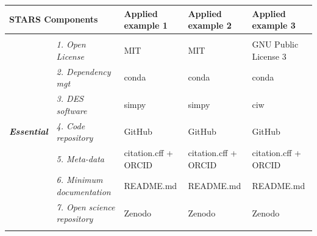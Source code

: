\documentclass[]{interact}
\theoremstyle{plain}%
\theoremstyle{definition}
\theoremstyle{remark}
\begin{document}
\begin{table}[htp!]
{\begin{tabular}{lllll} \toprule
\multicolumn{2}{l}{\textbf{STARS Components}}                                    & \textbf{Applied example 1} & \textbf{Applied example 2} & \textbf{Applied example 3} \\ 
\hline \\
\multirow{7}{*}{\textit{\textbf{Essential}}}     & \textit{1. Open License}              & MIT                                                          & MIT                                                          & GNU Public License 3                                         \\
                                            & \textit{2. Dependency mgt}            & conda                                                       & conda                                                        & conda                                                        \\
                                            & \textit{3. DES software}              & simpy                                                        & simpy                                                        & ciw                                                          \\
                                            & \textit{4. Code repository}           & GitHub                                                       & GitHub                                                       & GitHub                                                       \\
                                            & \textit{5. Meta-data}                 & citation.cff + ORCID & 
                                            citation.cff + ORCID & citation.cff + ORCID \\
                                            & \textit{6. Minimum documentation}     & README.md                                                    & README.md                                                    & README.md                                                    \\
                                            & \textit{7. Open science repository}   & Zenodo                                                       & Zenodo                                                       & Zenodo                                                       \\ \hline \\

\end{tabular}}
\end{table}
\end{document}
